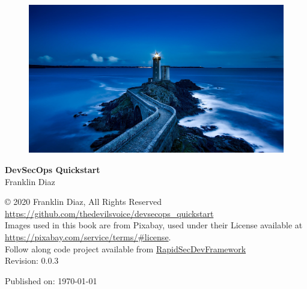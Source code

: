 \begin{titlepage}
    \centering
        \vspace{0mm}
            \begin{figure}[!h]
                \centering
                \includegraphics[scale=1.0]{../../images/plouzane-1758197_1920.jpg}
            \end{figure}
        \vspace*{40mm} %
        \begin{flushright}
            \textbf{\textsf{\Huge {DevSecOps Quickstart}}}\\
            \vspace{5mm}
            \Large \textsf{Franklin Diaz}\\
            \vspace*{0mm}
        \end{flushright}
	\clearpage
		\vspace*{\fill}
	\begingroup
		\centering
			\textsf{© 2020 Franklin Diaz, All Rights Reserved}\\
			\vspace*{3mm}
			\url{https://github.com/thedevilsvoice/devsecops_quickstart}\\
			\vspace*{3mm}
			\textsf{Images used in this book are from Pixabay, used under their License available at }
			\url{https://pixabay.com/service/terms/#license}.\\
			\vspace*{3mm}
			\textsf{Follow along code project available from }{\href{https://github.com/hotpeppersec/rapid_secdev_framework}{RapidSecDevFramework}}\\
			\vspace*{3mm}
			Revision: 0.0.3
			
			Published on: \today
			\endgroup
			\vspace*{\fill}
\end{titlepage}

\clearpage
\tableofcontents
{}
\listoffigures
\listoftables
\clearpage
{}